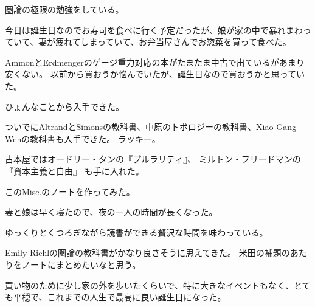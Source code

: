 \documentclass[uplatex]{jsarticle}
\begin{document}
圏論の極限の勉強をしている。

今日は誕生日なのでお寿司を食べに行く予定だったが、娘が家の中で暴れまわっていて、妻が疲れてしまっていて、お弁当屋さんでお惣菜を買って食べた。

AmmonとErdmengerのゲージ重力対応の本がたまたま中古で出ているがあまり安くない。
以前から買おうか悩んでいたが、誕生日なので買おうかと思っていた。

ひょんなことから入手できた。

ついでにAltrandとSimonsの教科書、中原のトポロジーの教科書、Xiao Gang Wenの教科書も入手できた。
ラッキー。

古本屋ではオードリー・タンの『プルラリティ』、
ミルトン・フリードマンの『資本主義と自由』
も手に入れた。

このMisc.のノートを作ってみた。

妻と娘は早く寝たので、夜の一人の時間が長くなった。

ゆっくりとくつろぎながら読書ができる贅沢な時間を味わっている。

Emily Riehlの圏論の教科書がかなり良さそうに思えてきた。
米田の補題のあたりをノートにまとめたいなと思う。

買い物のために少し家の外を歩いたくらいで、特に大きなイベントもなく、とても平穏で、これまでの人生で最高に良い誕生日になった。
\end{document}
